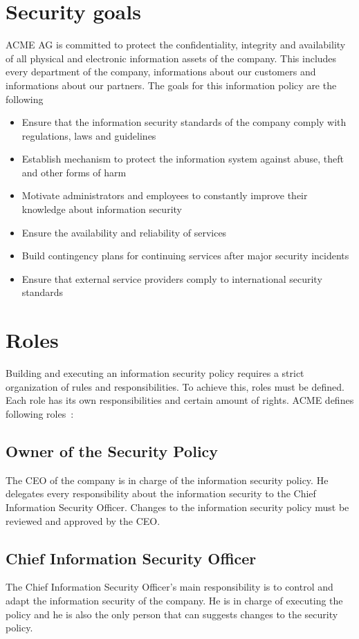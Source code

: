 \chapter{Security goals}
ACME AG is committed to protect the confidentiality, integrity and availability
of all physical and electronic information assets of the company. This includes
every department of the company, informations about our customers and
informations about our partners. The goals for this information policy are the
following~\cite{Host}
\begin{itemize}
\item Ensure that the information security standards of the company comply with regulations, laws and guidelines
\item Establish mechanism to protect the information system against abuse, theft and other forms of harm
\item Motivate administrators and employees to constantly improve their knowledge about information security 
\item Ensure the availability and reliability of services
\item Build contingency plans for continuing services after major security incidents
\item Ensure that external service providers comply to international security standards
\end{itemize}
\chapter{Roles}
Building and executing an information security policy requires a strict organization of rules and responsibilities. To achieve this, roles must be defined. Each role has its own responsibilities and certain amount of rights. ACME defines following roles~\cite{Host}:
\section{Owner of the Security Policy}
The CEO of the company is in charge of the information security policy. He delegates every responsibility about the information security to the Chief Information Security Officer. Changes to the information security policy must be reviewed and approved by the CEO. 
\section{Chief Information Security Officer}
The Chief Information Security Officer's main responsibility is to control and adapt the information security of the company.  He is in charge of executing the policy and he is also the only person that can suggests changes to the security policy. 
